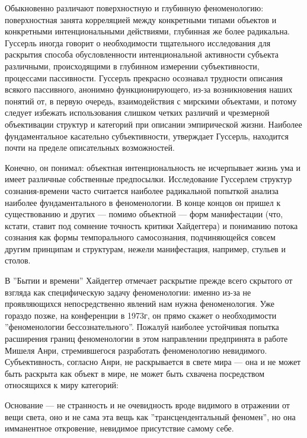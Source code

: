 \documentclass[11pt]{book}
\begin{document}
Обыкновенно различают поверхностную и глубинную феноменологию: поверхностная занята корреляцией между конкретными типами объектов и конкретными интенциональными действиями, глубинная же более радикальна. Гуссерль иногда говорит о необходимости тщательного исследования для раскрытия способа обусловленности интенциональной активности субъекта различными, происходящими в глубинном измерении субъективности, процессами пассивности. Гуссерль прекрасно осознавал трудности описания всякого пассивного, анонимно функционирующего, из-за возникновения наших понятий от, в первую очередь, взаимодействия с мирскими объектами, и потому следует избежать использования слишком четких различий и чрезмерной объективации структур и категорий при описании эмпирической жизни. Наиболее фундаментальное касательно субъективности, утверждает Гуссерль, находится почти на пределе описательных возможностей.

Конечно, он понимал: объектная интенциональность не исчерпывает жизнь ума и имеет различные собственные предпосылки. Исследование Гуссерлем структур сознания-времени часто считается наиболее радикальной попыткой анализа наиболее фундаментального в феноменологии. В конце концов он пришел к существованию и других --- помимо объектной --- форм манифестации (что, кстати, ставит под сомнение точность критики Хайдеггера) и пониманию потока сознания как формы темпорального самосознания, подчиняющейся совсем другим принципам и структурам, нежели манифестация, например, стульев и столов.

В ''Бытии и времени'' Хайдеггер отмечает раскрытие прежде всего скрытого от взгляда как специфическую задачу феноменологии: именно из-за не проявляющихся непосредственно явлений нам нужна феноменология. Уже гораздо позже, на конференции в 1973г, он прямо скажет о необходимости ''феноменологии бессознательного''. Пожалуй наиболее устойчивая попытка расширения границ феноменологии в этом направлении предпринята в работе Мишеля Анри, стремившегося разработать феноменологию невидимого. Субъективность, согласно Анри, не раскрывается в свете мира --- она и не может быть раскрыта как объект в мире, не может быть схвачена посредством относящихся к миру категорий:

\smallskip
{}\relax
{}\relax

Основание --- не странность и не очевидность вроде видимого в отражении от вещи света, оно и не сама эта вещь как ''трансцендентальный феномен'', но она имманентное откровение, невидимое присутствие самому себе.
\end{document}
